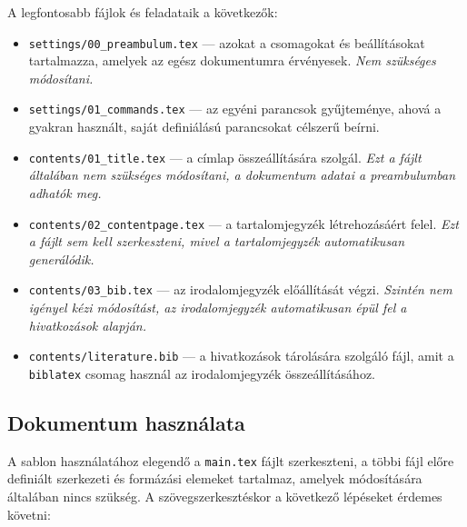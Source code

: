 \documentclass[fleqn,12pt]{article}
\begin{document}
        A legfontosabb fájlok és feladataik a következők:
        \begin{itemize}
            \item \texttt{settings/00\_preambulum.tex} — azokat a csomagokat és beállításokat tartalmazza, amelyek az egész dokumentumra érvényesek. \emph{Nem szükséges módosítani.}
            \item \texttt{settings/01\_commands.tex} — az egyéni parancsok gyűjteménye, ahová a gyakran használt, saját definiálású parancsokat célszerű beírni. 
            \item \texttt{contents/01\_title.tex} — a címlap összeállítására szolgál. \emph{Ezt a fájlt általában nem szükséges módosítani, a dokumentum adatai a preambulumban adhatók meg.}
            \item \texttt{contents/02\_contentpage.tex} — a tartalomjegyzék létrehozásáért felel. \emph{Ezt a fájlt sem kell szerkeszteni, mivel a tartalomjegyzék automatikusan generálódik.}
            \item \texttt{contents/03\_bib.tex} — az irodalomjegyzék előállítását végzi. \emph{Szintén nem igényel kézi módosítást, az irodalomjegyzék automatikusan épül fel a hivatkozások alapján.}
            \item \texttt{contents/literature.bib} — a hivatkozások tárolására szolgáló fájl, amit a \texttt{biblatex} csomag használ az irodalomjegyzék összeállításához.
        \end{itemize}

    \subsection{Dokumentum használata}

        A sablon használatához elegendő a \texttt{main.tex} fájlt szerkeszteni, a többi fájl előre definiált szerkezeti és formázási elemeket tartalmaz, amelyek módosítására általában nincs szükség. A szövegszerkesztéskor a következő lépéseket érdemes követni:
\end{document}
